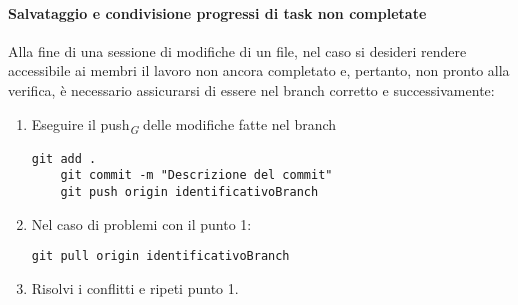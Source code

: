 \hypertarget{par:salvataggioecondivisioneprogressitasknoncompletate}{\paragraph*{{\textbf{Salvataggio e condivisione progressi di task non completate}}}}
Alla fine di una sessione di modifiche di un file, nel caso si desideri rendere accessibile ai membri il lavoro non ancora completato e, pertanto, non pronto alla verifica, è necessario assicurarsi di essere nel branch corretto e successivamente:
\begin{enumerate}
    \item Eseguire il push\textsubscript{\textit{G}}  delle modifiche fatte nel branch
          \begin{lstlisting}[style=code]
    git add .
    git commit -m "Descrizione del commit"
    git push origin identificativoBranch
        \end{lstlisting}

    \item Nel caso di problemi con il punto 1:
          \begin{lstlisting}[style=code]
   git pull origin identificativoBranch
        \end{lstlisting}
    \item Risolvi i conflitti e ripeti punto 1.
\end{enumerate}

\vspace{0.3cm}

